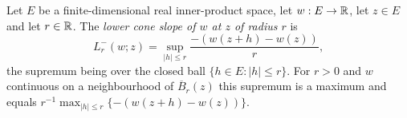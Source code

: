 \begin{definition}
Let $E$ be a finite-dimensional real inner-product space, let $w:E\to\mathbb{R}$, let
$z\in E$ and let $r\in\mathbb{R}$. The \emph{lower cone slope of $w$ at $z$ of radius
$r$} is
\[
  L_r^-(w;z)=\sup_{|h|\le r}\frac{-(w(z+h)-w(z))}{r},
\]
the supremum being over the closed ball $\{h\in E:|h|\le r\}$. For $r>0$ and $w$
continuous on a neighbourhood of $\overline B_r(z)$ this supremum is a maximum
and equals $r^{-1}\max_{|h|\le r}\{-(w(z+h)-w(z))\}$.
\end{definition}

